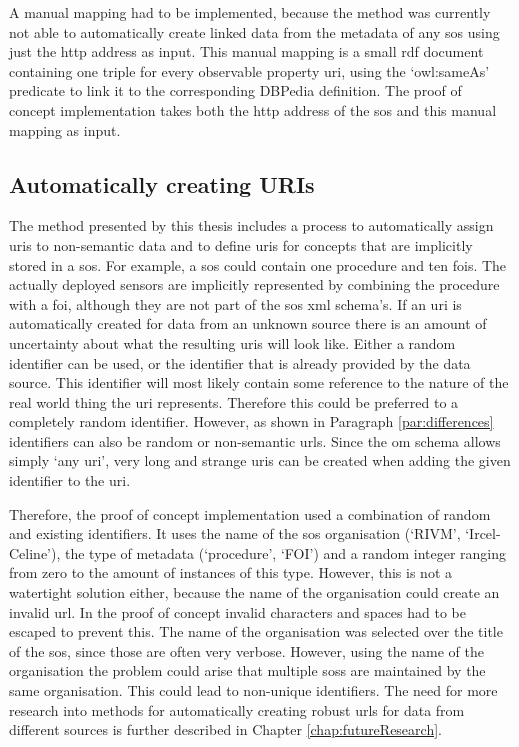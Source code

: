  A manual mapping had to be implemented, because the method was currently not able to automatically create linked data from the metadata of any \ac{sos} using just the \ac{http} address as input. This manual mapping is a small \ac{rdf} document containing one triple for every observable property \ac{uri}, using the `owl:sameAs' predicate to link it to the corresponding DBPedia definition. The proof of concept implementation takes both the \ac{http} address of the \ac{sos} and this manual mapping as input.          

\subsection{Automatically creating URIs}
The method presented by this thesis includes a process to automatically assign \acp{uri} to non-semantic data and to define \acp{uri} for concepts that are implicitly stored in a \ac{sos}. For example, a \ac{sos} could contain one procedure and ten \acp{foi}. The actually deployed sensors are implicitly represented by combining the procedure with a \ac{foi}, although they are not part of the \ac{sos} \ac{xml} schema's. If an \ac{uri} is automatically created for data from an unknown source there is an amount of uncertainty about what the resulting \acp{uri} will look like. Either a random identifier can be used, or the identifier that is already provided by the data source. This identifier will most likely contain some reference to the nature of the real world thing the \ac{uri} represents. Therefore this could be preferred to a completely random identifier. However, as shown in Paragraph \ref{par:differences} identifiers can also be random or non-semantic \acp{url}. Since the \ac{om} schema allows simply `any \ac{uri}', very long and strange \acp{uri} can be created when adding the given identifier to the \ac{uri}. 

Therefore, the proof of concept implementation used a combination of random and existing identifiers. It uses the name of the \ac{sos} organisation (`RIVM', `Ircel-Celine'), the type of metadata (`procedure', `FOI') and a random integer ranging from zero to the amount of instances of this type. However, this is not a watertight solution either, because the name of the organisation could create an invalid \ac{url}. In the proof of concept invalid characters and spaces had to be escaped to prevent this. The name of the organisation was selected over the title of the \ac{sos}, since those are often very verbose. However, using the name of the organisation the problem could arise that multiple \aclp{sos} are maintained by the same organisation. This could lead to non-unique identifiers. The need for more research into methods for automatically creating robust \acp{url} for data from different sources is further described in Chapter \ref{chap:futureResearch}.      

